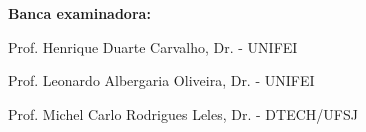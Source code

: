     \vspace{1cm}

    \textbf{Banca examinadora:}

    \vspace{1cm}    

    Prof. Henrique Duarte Carvalho, Dr. - UNIFEI
    
    \vspace{1cm}    
    Prof. Leonardo Albergaria Oliveira, Dr. - UNIFEI
    
    \vspace{1cm}    
    Prof. Michel Carlo Rodrigues Leles, Dr. - DTECH/UFSJ

    \null\vfil
    \center \Location
    \center \Year
    \pagebreak









    

    
    
    

